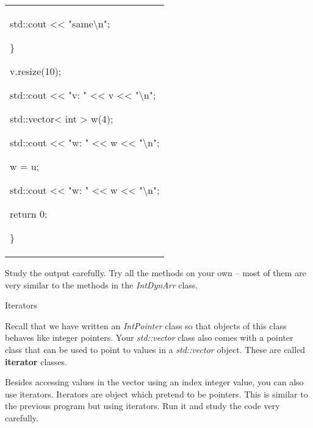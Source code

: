 \documentclass[
]{article}
\begin{document}
\begin{longtable}[]{@{}
  >{\raggedright\arraybackslash}p{}@{}}
std::cout \textless\textless{} "same\textbackslash n";

\}

v.resize(10);

std::cout \textless\textless{} "v: " \textless\textless{} v
\textless\textless{} "\textbackslash n";

std::vector\textless{} int \textgreater{} w(4);

std::cout \textless\textless{} "w: " \textless\textless{} w
\textless\textless{} "\textbackslash n";

w = u;

std::cout \textless\textless{} "w: " \textless\textless{} w
\textless\textless{} "\textbackslash n";

return 0;

\} \\
\end{longtable}

Study the output carefully. Try all the methods on your own -- most of
them are very similar to the methods in the \emph{IntDynArr} class.

Iterators

Recall that we have written an \emph{IntPointer} class so that objects
of this class behaves like integer pointers. Your \emph{std::vector}
class also comes with a pointer class that can be used to point to
values in a \emph{std::vector} object. These are called
\textbf{iterator} classes.

Besides accessing values in the vector using an index integer value, you
can also use iterators. Iterators are object which pretend to be
pointers. This is similar to the previous program but using iterators.
Run it and study the code very carefully.
\end{document}
